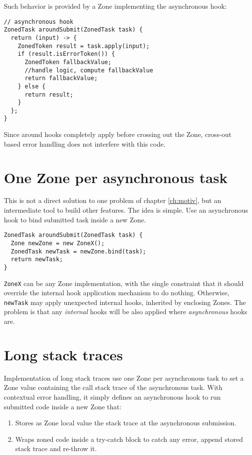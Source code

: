 Such behavior is provided by a Zone implementing the asynchronous hook:

\begin{lstlisting}
// asynchronous hook
ZonedTask aroundSubmit(ZonedTask task) {
  return (input) -> {
    ZonedToken result = task.apply(input);
    if (result.isErrorToken()) {
      ZonedToken fallbackValue;
      //handle logic, compute fallbackValue
      return fallbackValue;
    } else {
      return result;
    }
  };
}
\end{lstlisting}

Since around hooks completely apply before crossing out the Zone, cross-out based error handling does not interfere with this code.

\section{One Zone per asynchronous task}

This is not a direct solution to one problem of chapter \ref{ch:motiv}, but an intermediate tool to build other features. The idea is simple. Use an asynchronous hook to bind submitted task inside a new Zone.

\begin{lstlisting}
ZonedTask aroundSubmit(ZonedTask task) {
  Zone newZone = new ZoneX();
  ZonedTask newTask = newZone.bind(task);
  return newTask;
}
\end{lstlisting}

\lstinline{ZoneX} can be any Zone implementation, with the single constraint that it should override the internal hook application mechanism to do nothing. Otherwise, \lstinline{newTask} may apply unexpected internal hooks, inherited by enclosing Zones. The problem is that any \emph{internal} hooks will be also applied where \emph{asynchronous} hooks are.

\section{Long stack traces}

Implementation of long stack traces use one Zone per asynchronous task to set a Zone value containing the call stack trace of the asynchronous task. With contextual error handling, it simply defines an asynchronous hook to run submitted code inside a new Zone that:
\begin{enumerate}
\item Stores as Zone local value the stack trace at the asynchronous submission.
\item Wraps zoned code inside a try-catch block to catch any error, append stored stack trace and re-throw it.
\end{enumerate}


